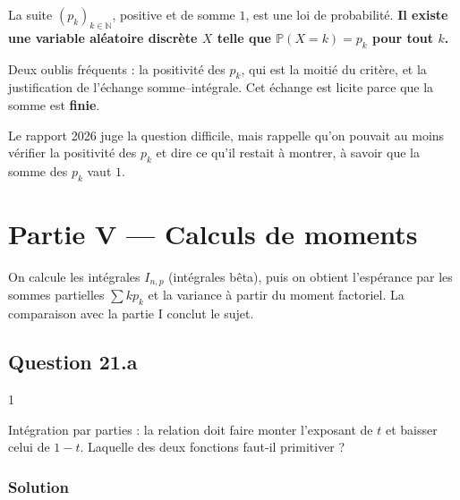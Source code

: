 \documentclass[11pt,a4paper]{article}
\begin{document}
La suite \((p_k)_{k\in\mathbb N}\), positive et de somme \(1\), est une loi de probabilité. \textbf{Il existe une variable aléatoire discrète \(X\) telle que \(\mathbb P(X=k)=p_k\) pour tout \(k\).}

\begin{piege}

Deux oublis fréquents : la positivité des \(p_k\), qui est la moitié du critère, et la justification de l'échange somme--intégrale. Cet échange est licite parce que la somme est \textbf{finie}.

\end{piege}

\begin{jury}

Le rapport 2026 juge la question difficile, mais rappelle qu'on pouvait au moins vérifier la positivité des \(p_k\) et dire ce qu'il restait à montrer, à savoir que la somme des \(p_k\) vaut \(1\).

\end{jury}

\hypertarget{partie-v-calculs-de-moments}{%
\section{Partie V --- Calculs de moments}\label{partie-v-calculs-de-moments}}

On calcule les intégrales \(I_{n,p}\) (intégrales bêta), puis on obtient l'espérance par les sommes partielles \(\sum kp_k\) et la variance à partir du moment factoriel. La comparaison avec la partie I conclut le sujet.

\hypertarget{question-21.a}{%
\subsection{Question 21.a}\label{question-21.a}}

\begin{indication}{1}

Intégration par parties : la relation doit faire monter l'exposant de \(t\) et baisser celui de \(1-t\). Laquelle des deux fonctions faut-il primitiver ?

\end{indication}

\hypertarget{solution-27}{%
\subsubsection{Solution}\label{solution-27}}
\end{document}
